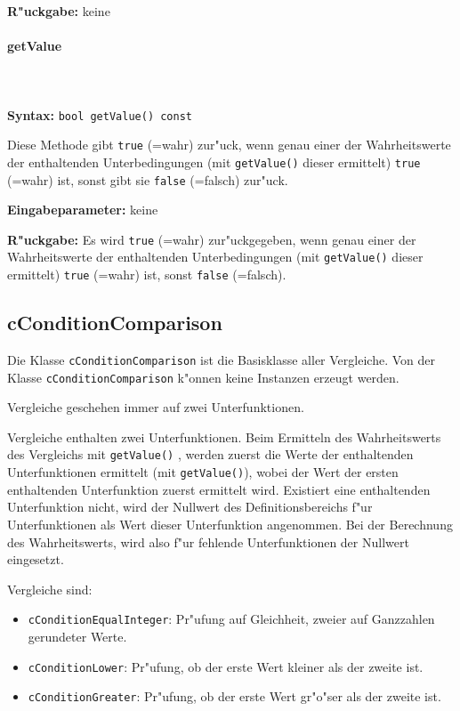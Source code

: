 \bigskip\noindent
\textbf{R"uckgabe:} keine


\paragraph{getValue}

\ \\\\\noindent
\textbf{Syntax:} \verb|bool getValue() const|

\bigskip\noindent
Diese Methode gibt \verb|true| (=wahr) zur"uck, wenn genau einer der Wahrheitswerte der enthaltenden Unterbedingungen (mit \verb|getValue()| dieser ermittelt) \verb|true| (=wahr) ist, sonst gibt sie \verb|false| (=falsch) zur"uck.

\bigskip\noindent
\textbf{Eingabeparameter:} keine

\bigskip\noindent
\textbf{R"uckgabe:} Es wird \verb|true| (=wahr) zur"uckgegeben, wenn genau einer der Wahrheitswerte der enthaltenden Unterbedingungen (mit \verb|getValue()| dieser ermittelt) \verb|true| (=wahr) ist, sonst \verb|false| (=falsch).



\subsection{cConditionComparison}


Die Klasse \verb|cConditionComparison| ist die Basisklasse aller Vergleiche. Von der Klasse \verb|cConditionComparison| k"onnen keine Instanzen erzeugt werden.

Vergleiche geschehen immer auf zwei Unterfunktionen.

Vergleiche enthalten zwei Unterfunktionen. Beim Ermitteln des Wahrheitswerts des Vergleichs mit \verb|getValue()| , werden zuerst die Werte der enthaltenden Unterfunktionen ermittelt (mit \verb|getValue()|), wobei der Wert der ersten enthaltenden Unterfunktion zuerst ermittelt wird. Existiert eine enthaltenden Unterfunktion nicht, wird der Nullwert des Definitionsbereichs f"ur Unterfunktionen als Wert dieser Unterfunktion angenommen. Bei der Berechnung des Wahrheitswerts, wird also f"ur fehlende Unterfunktionen der Nullwert eingesetzt.

\bigskip\noindent
Vergleiche sind:
\begin{itemize}
 \item \verb|cConditionEqualInteger|: Pr"ufung auf Gleichheit, zweier auf Ganzzahlen gerundeter Werte.
 \item \verb|cConditionLower|: Pr"ufung, ob der erste Wert kleiner als der zweite ist.
 \item \verb|cConditionGreater|: Pr"ufung, ob der erste Wert gr"o"ser als der zweite ist.
\end{itemize}


